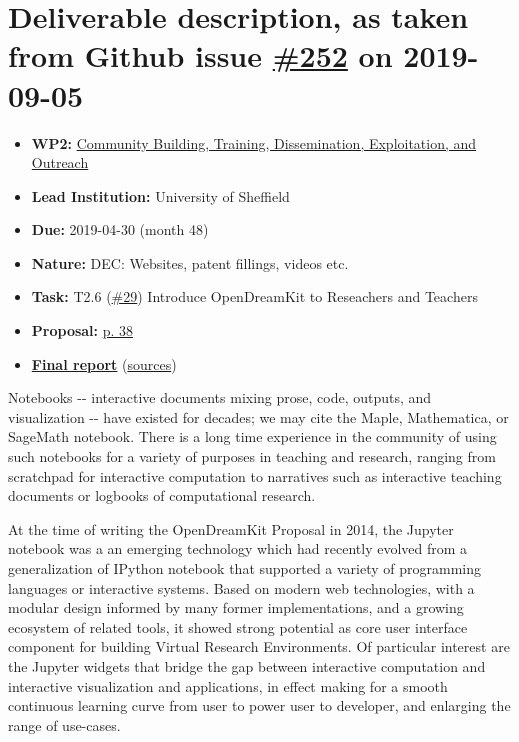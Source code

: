 \hypertarget{deliverable-description-as-taken-from-github-issue-252-on-2019-09-05}{%
\section*{\texorpdfstring{Deliverable description, as taken from Github
issue
\href{https://github.com/OpenDreamKit/OpenDreamKit/issues/252}{\#252} on
2019-09-05}{Deliverable description, as taken from Github issue \#252 on 2019-09-05}}\label{deliverable-description-as-taken-from-github-issue-252-on-2019-09-05}}

\begin{itemize}
\tightlist
\item
  \textbf{WP2:}
  \href{https://github.com/OpenDreamKit/OpenDreamKit/tree/master/WP2}{Community
  Building, Training, Dissemination, Exploitation, and Outreach}
\item
  \textbf{Lead Institution:} University of Sheffield
\item
  \textbf{Due:} 2019-04-30 (month 48)
\item
  \textbf{Nature:} DEC: Websites, patent fillings, videos etc.
\item
  \textbf{Task:} T2.6
  (\href{https://github.com/OpenDreamKit/OpenDreamKit/issues/29}{\#29})
  Introduce OpenDreamKit to Reseachers and Teachers
\item
  \textbf{Proposal:}
  \href{https://github.com/OpenDreamKit/OpenDreamKit/raw/master/Proposal/proposal-www.pdf}{p.
  38}
\item
  \textbf{\href{https://github.com/OpenDreamKit/OpenDreamKit/raw/master/WP2/D2.17/report-final.pdf}{Final
  report}}
  (\href{https://github.com/OpenDreamKit/OpenDreamKit/raw/master/WP2/D2.17/}{sources})
\end{itemize}

Notebooks -\/- interactive documents mixing prose, code, outputs, and
visualization -\/- have existed for decades; we may cite the Maple,
Mathematica, or SageMath notebook. There is a long time experience in
the community of using such notebooks for a variety of purposes in
teaching and research, ranging from scratchpad for interactive
computation to narratives such as interactive teaching documents or
logbooks of computational research.

At the time of writing the OpenDreamKit Proposal in 2014, the Jupyter
notebook was a an emerging technology which had recently evolved from a
generalization of IPython notebook that supported a variety of
programming languages or interactive systems. Based on modern web
technologies, with a modular design informed by many former
implementations, and a growing ecosystem of related tools, it showed
strong potential as core user interface component for building Virtual
Research Environments. Of particular interest are the Jupyter widgets
that bridge the gap between interactive computation and interactive
visualization and applications, in effect making for a smooth continuous
learning curve from user to power user to developer, and enlarging the
range of use-cases.

